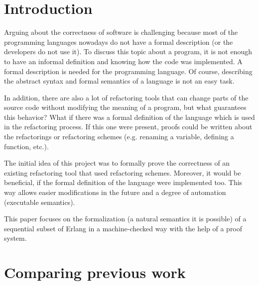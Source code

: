 \documentclass[12pt]{article}
\theoremstyle{definition}
\numberwithin{equation}{section}
\begin{document}
\section{Introduction}



Arguing about the correctness of software is challenging because most of the programming languages nowadays do not have a formal description (or the developers do not use it). To discuss this topic about a program, it is not enough to have an informal definition and knowing how the code was implemented. A formal description is needed for the programming language. Of course, describing the abstract syntax and formal semantics of a language is not an easy task.

In addition, there are also a lot of refactoring tools that can change parts of the source code without modifying the meaning of a program, but what guarantees this behavior? What if there was a formal definition of the language which is used in the refactoring process. If this one were present, proofs could be written about the refactorings or refactoring schemes (e.g. renaming a variable, defining a function, etc.).


The initial idea of this project was to formally prove the correctness of an existing refactoring tool that used refactoring schemes. Moreover, it would be beneficial, if the formal definition of the language were implemented too. This way allows easier modifications in the future and a degree of automation (executable semantics). 

This paper focuses on the formalization (a natural semantics it is possible) of a sequential subset of Erlang in a machine-checked way with the help of a proof system.

\section{Comparing previous work}
\end{document}
